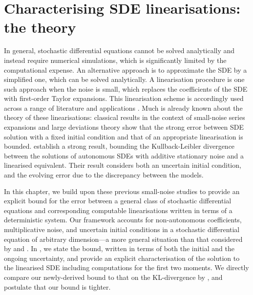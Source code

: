 \chapter{Characterising SDE linearisations: the theory}\label{ch:linear_theory}
In general, stochastic differential equations cannot be solved analytically and instead require numerical simulations, which is significantly limited by the computational expense.
An alternative approach is to approximate the SDE by a simplified one, which can be solved analytically.
A linearisation procedure is one such approach when the noise is small, which replaces the coefficients of the SDE with first-order Taylor expansions.
This linearisation scheme is accordingly used across a range of literature and applications \citep{Jazwinski_2014_StochasticProcessesFiltering,SarkkaSolin_2019_AppliedStochasticDifferential,KaszasHaller_2020_UniversalUpperEstimate,ArchambeauEtAl_2007_GaussianProcessApproximations,Sanz-AlonsoStuart_2017_GaussianApproximationsSmall,LawEtAl_2015_DataAssimilationMathematical,ReichCotter_2015_ProbabilisticForecastingBayesian,BudhirajaEtAl_2019_AssimilatingDataModels,LeGlandWang_2002_AsymptoticNormalityPartially}.
Much is already known about the theory of these linearisations: classical results in the context of small-noise series expansions \citep{Blagoveshchenskii_1962_DiffusionProcessesDepending} and large deviations theory \citep{FreidlinWentzell_1998_RandomPerturbationsDynamical} show that the strong error between SDE solution with a fixed initial condition and that of an appropriate linearisation is bounded.
\citet{Sanz-AlonsoStuart_2017_GaussianApproximationsSmall} establish a strong result, bounding the Kullback-Leibler divergence between the solutions of autonomous SDEs with additive stationary noise and a linearised equivalent. Their result considers both an uncertain initial condition, and the evolving error due to the discrepancy between the models.

In this chapter, we build upon these previous small-noise studies \citep{Blagoveshchenskii_1962_DiffusionProcessesDepending,FreidlinWentzell_1998_RandomPerturbationsDynamical,Sanz-AlonsoStuart_2017_GaussianApproximationsSmall} to provide an explicit bound for the error between a general class of stochastic differential equations and corresponding computable linearisations written in terms of a deterministic system.
Our framework accounts for non-autonomous coefficients, multiplicative noise, and uncertain initial conditions in a stochastic differential equation of arbitrary dimension---a more general situation than that considered by \citet{Blagoveshchenskii_1962_DiffusionProcessesDepending} and \citet{FreidlinWentzell_1998_RandomPerturbationsDynamical}.
In , we state the bound, written in terms of both the initial and the ongoing uncertainty, and provide an explicit characterisation of the solution to the linearised SDE including computations for the first two moments.
We directly compare our newly-derived bound to that on the KL-divergence by \citet{Sanz-AlonsoStuart_2017_GaussianApproximationsSmall}, and postulate that our bound is tighter.


